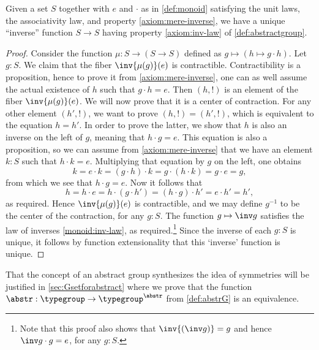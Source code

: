 \begin{lemma}%
  \label{lem:group-inv-operation}%
  Given a set $S$ together with $e$ and $\cdot$ as in
  \cref{def:monoid} satisfying the unit laws, the associativity
  law, and property \ref{axiom:mere-inverse}, we have a unique ``inverse'' function
  $S \to S$ having property \ref{axiom:inv-law} of \cref{def:abstractgroup}.
\end{lemma}

\begin{proof}
  Consider the function $\mu: S \to (S \to S)$ defined as
  $g\mapsto (h \mapsto g\cdot h)$. Let $g:S$. We claim that the fiber
  $\inv{\mu(g)}(e)$ is contractible.  Contractibility is a proposition, 
  hence to
  prove it from \ref{axiom:mere-inverse}, one can as well assume the
  actual existence of $h$ such that $g\cdot h = e$. Then $(h,!)$ is an
  element of the fiber $\inv{\mu(g)}(e)$. We will now prove that it is
  a center of contraction. For any other element $(h',!)$, we want to
  prove $(h,!) = (h',!)$, which is equivalent to the equation $h=h'$. In
  order to prove the latter, we show that $h$ is also an inverse on
  the left of $g$, meaning that $h\cdot g=e$.  This equation is also a
  proposition, so we can assume from \ref{axiom:mere-inverse} that we have an
  element $k:S$ such that $h\cdot k = e$.  Multiplying that equation by
  $g$ on the left, one obtains
  \begin{displaymath}
    k = e \cdot k = (g\cdot h)\cdot k = g\cdot (h\cdot k) = g\cdot e = g,
  \end{displaymath}
  from which we see that $h\cdot g=e$.
  Now it follows that
  \begin{displaymath}
    h = h \cdot e = h \cdot (g\cdot h') = (h \cdot g) \cdot h' = e \cdot h' = h',
  \end{displaymath}
  as required. Hence $\inv{\mu(g)}(e)$ is contractible, and we may define $g^{-1}$ to
  be the center of the contraction, for any $g:S$.
  The function $g \mapsto \inv g$ satisfies the law of inverses 
  \ref{monoid:inv-law}, as required.\footnote{%
  Note that this proof also shows that  $\inv{(\inv g)} = g$ and hence
  $\inv g \cdot g = e$, for any $g:S$.}
  Since the inverse of each $g:S$ is unique, it follows by function
  extensionality that this `inverse' function is unique.
\end{proof}

\begin{remark}
  That the concept of an abstract group synthesizes the idea of symmetries
  will be justified in \cref{sec:Gsetforabstract} where we prove that
  the function $\abstr:\typegroup\to\typegroup^{\abstr}$ from 
  \cref{def:abstrG} is an equivalence.
\end{remark}

